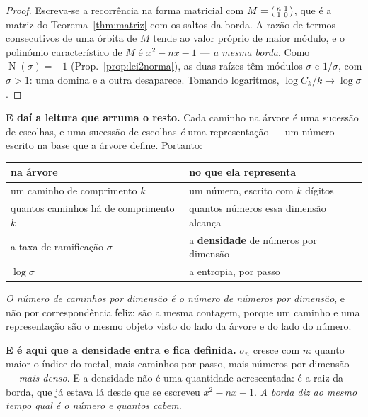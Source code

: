\documentclass[livro.tex]{subfiles}
\begin{document}
\begin{proof}
Escreva-se a recorrência na forma matricial com $M=\begin{psmallmatrix}n&1\\1&0\end{psmallmatrix}$,
que é a matriz do Teorema~\ref{thm:matriz} com os saltos da borda. A razão de termos consecutivos
de uma órbita de $M$ tende ao valor próprio de maior módulo, e o polinómio característico de $M$
é $x^{2}-nx-1$ --- \emph{a mesma borda}. Como $\operatorname{N}(\sigma)=-1$ (Prop.~\ref{prop:lei2norma}),
as duas raízes têm módulos $\sigma$ e $1/\sigma$, com $\sigma>1$: uma domina e a outra desaparece.
Tomando logaritmos, $\log C_k/k\to\log\sigma$.
\end{proof}

\noindent \textbf{E daí a leitura que arruma o resto.} Cada caminho na árvore é uma sucessão de
escolhas, e uma sucessão de escolhas \emph{é} uma representação --- um número escrito na base que a
árvore define. Portanto:

\begin{center}\small
\begin{tabular}{@{}ll@{}}
\toprule
\textbf{na árvore} & \textbf{no que ela representa} \\
\midrule
um caminho de comprimento $k$ & um número, escrito com $k$ dígitos \\
quantos caminhos há de comprimento $k$ & quantos números essa dimensão alcança \\
a taxa de ramificação $\sigma$ & a \textbf{densidade} de números por dimensão \\
$\log\sigma$ & a entropia, por passo \\
\bottomrule
\end{tabular}
\end{center}

\noindent \emph{O número de caminhos por dimensão é o número de números por dimensão}, e não por
correspondência feliz: são a mesma contagem, porque um caminho e uma representação são o mesmo
objeto visto do lado da árvore e do lado do número.

\medskip
\noindent \textbf{E é aqui que a densidade entra e fica definida.} $\sigma_n$ cresce com $n$: quanto
maior o índice do metal, mais caminhos por passo, mais números por dimensão --- \emph{mais denso}. E
a densidade não é uma quantidade acrescentada: é a raiz da borda, que já estava lá desde que se
escreveu $x^{2}-nx-1$. \emph{A borda diz ao mesmo tempo qual é o número e quantos cabem.}
\end{document}
